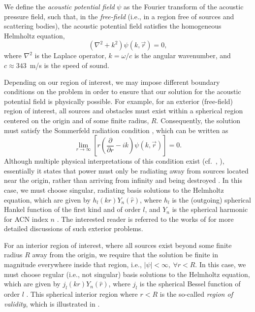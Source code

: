 We define the \textit{acoustic potential field} $\psi$ as the Fourier transform of the acoustic pressure field, such that, in the \textit{free-field} (i.e., in a region free of sources and scattering bodies), the acoustic potential field satisfies the homogeneous Helmholtz equation,
\begin{equation}\label{eq:02_Acoustical_Theory:Helmholtz_Equation}
\left( \nabla^2 + k^2 \right) \psi(k,\vec{r}) = 0,
\end{equation}
where $\nabla^2$ is the Laplace operator, $k = \omega / c$ is the angular wavenumber, and $c \approx 343$~m/s is the speed of sound.

Depending on our region of interest, we may impose different boundary conditions on the problem in order to ensure that our solution for the acoustic potential field is physically possible.
For example, for an exterior (free-field) region of interest, all sources and obstacles must exist within a spherical region centered on the origin and of some finite radius, $R$.
Consequently, the solution must satisfy the Sommerfeld radiation condition \citep[section 2.1.1]{Zotter2009PhD}, which can be written as
\begin{equation}
\lim_{r\to\infty} \left[ r \left( \frac{\partial}{\partial r} - i k \right) \psi (k,\vec{r}) \right] = 0.
\end{equation}
Although multiple physical interpretations of this condition exist (cf.~\citet[appendix A]{Zotter2009PhD}, \citet[section 4-5]{Pierce1994}), essentially it states that power must only be radiating away from sources located near the origin, rather than arriving from infinity and being destroyed \citep{WikiSommerfeldURL}.
In this case, we must choose singular, radiating basis solutions to the Helmholtz equation, which are given by $h_l(kr) Y_n(\hat{r})$, where $h_l$ is the (outgoing) spherical Hankel function of the first kind and of order $l$, and $Y_n$ is the spherical harmonic for ACN index $n$ \citep[section 6.7]{Williams1999}.
The interested reader is referred to the works of \citet{Zotter2009PhD,Williams1999} for more detailed discussions of such exterior problems.

For an interior region of interest, where all sources exist beyond some finite radius $R$ away from the origin, we require that the solution be finite in magnitude everywhere inside that region, i.e., $|\psi| < \infty,~\forall r < R$.
In this case, we must choose regular (i.e., not singular) basis solutions to the Helmholtz equation, which are given by $j_l(kr) Y_n(\hat{r})$, where $j_l$ is the spherical Bessel function of order $l$ \citep[section 6.8]{Williams1999}.
This spherical interior region where $r < R$ is the so-called \textit{region of validity}, which is illustrated in .


